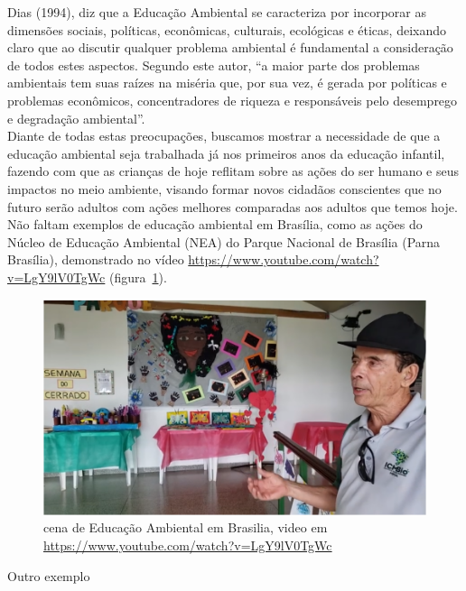 Dias (1994), diz que a Educação Ambiental se caracteriza por incorporar as dimensões sociais, políticas, econômicas, culturais, ecológicas e éticas, deixando claro que ao discutir qualquer problema ambiental é fundamental a consideração de todos estes aspectos. Segundo este autor, “a maior parte dos problemas ambientais tem suas raízes na miséria que, por sua vez, é gerada por políticas e problemas econômicos, concentradores de riqueza e responsáveis pelo desemprego e degradação ambiental”.\\

Diante de todas estas preocupações, buscamos mostrar a necessidade de que a educação ambiental seja trabalhada já nos primeiros anos da educação infantil, fazendo com que as crianças de hoje reflitam sobre as ações do ser humano e seus impactos no meio ambiente, visando formar novos cidadãos conscientes que no futuro serão adultos com ações melhores comparadas aos adultos que temos hoje.\\

Não faltam exemplos de educação ambiental em Brasília, como as ações do Núcleo de Educação Ambiental (NEA) do Parque Nacional de Brasília (Parna Brasília), demonstrado no vídeo \url{https://www.youtube.com/watch?v=LgY9lV0TgWc} (figura~\ref{fig:educacao-ambiental-em-brasilia}).

\begin{figure}[h!]
    \centering
    \includegraphics[width=0.7\linewidth]{"fig/Educação Ambiental em Brasília"}
    \caption[Educação Ambiental em Brasilia]{cena de Educação Ambiental em Brasilia, video em \url{https://www.youtube.com/watch?v=LgY9lV0TgWc}}
    \label{fig:educacao-ambiental-em-brasilia}
\end{figure}

Outro exemplo

